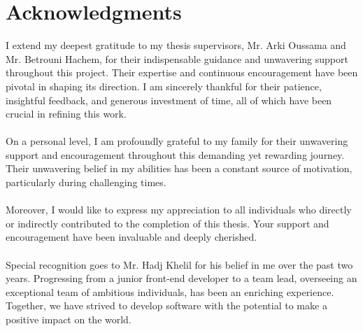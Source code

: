 \chapter*{Acknowledgments}

I extend my deepest gratitude to my thesis supervisors, Mr. Arki Oussama and Mr. Betrouni Hachem, for their indispensable guidance and unwavering support throughout this project. Their expertise and continuous encouragement have been pivotal in shaping its direction. I am sincerely thankful for their patience, insightful feedback, and generous investment of time, all of which have been crucial in refining this work.
\\
\\
On a personal level, I am profoundly grateful to my family for their unwavering support and encouragement throughout this demanding yet rewarding journey. Their unwavering belief in my abilities has been a constant source of motivation, particularly during challenging times.
\\
\\
Moreover, I would like to express my appreciation to all individuals who directly or indirectly contributed to the completion of this thesis. Your support and encouragement have been invaluable and deeply cherished.
\\
\\
Special recognition goes to Mr. Hadj Khelil for his belief in me over the past two years. Progressing from a junior front-end developer to a team lead, overseeing an exceptional team of ambitious individuals, has been an enriching experience. Together, we have strived to develop software with the potential to make a positive impact on the world.